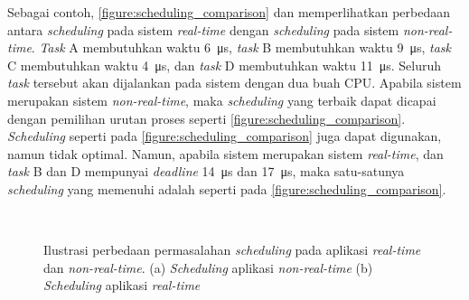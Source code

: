 Sebagai contoh, \autoref{figure:scheduling_comparison} dan  memperlihatkan perbedaan antara \textit{scheduling} pada sistem \textit{real-time} dengan \textit{scheduling} pada sistem \textit{non-real-time}.
\textit{Task} A membutuhkan waktu \SI{6}{\micro\second}, \textit{task} B membutuhkan waktu \SI{9}{\micro\second}, \textit{task} C membutuhkan waktu \SI{4}{\micro\second}, dan \textit{task} D membutuhkan waktu \SI{11}{\micro\second}.
Seluruh \textit{task} tersebut akan dijalankan pada sistem dengan dua buah CPU.
Apabila sistem merupakan sistem \textit{non-real-time}, maka \textit{scheduling} yang terbaik dapat dicapai dengan pemilihan urutan proses seperti \autoref{figure:scheduling_comparison}.
\textit{Scheduling} seperti pada \autoref{figure:scheduling_comparison} juga dapat digunakan, namun tidak optimal.
Namun, apabila sistem merupakan sistem \textit{real-time}, dan \textit{task} B dan D mempunyai \textit{deadline} \SI{14}{\micro\second} dan \SI{17}{\micro\second}, maka satu-satunya \textit{scheduling} yang memenuhi adalah seperti pada \autoref{figure:scheduling_comparison}.

\begin{figure}[htbp]
    \centering
    \vspace{18pt}
    \\
    \vspace{18pt}\hspace{24pt}
    \caption[Ilustrasi perbedaan permasalahan \textit{scheduling} pada aplikasi \textit{real-time} dan \textit{non-real-time}]{Ilustrasi perbedaan permasalahan \textit{scheduling} pada aplikasi \textit{real-time} dan \textit{non-real-time}. (a) \textit{Scheduling} aplikasi \textit{non-real-time} (b) \textit{Scheduling} aplikasi \textit{real-time}}
    \label{figure:scheduling_comparison}
\end{figure}

